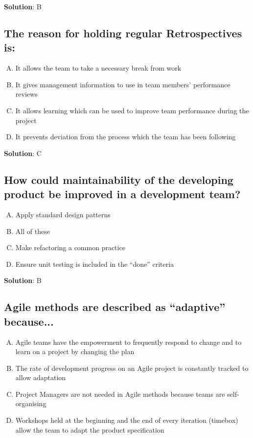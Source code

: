\textbf{Solution}: B


\subsection{The reason for holding regular Retrospectives is:}
\begin{enumerate}[A)]
  \item It allows the team to take a necessary break from work
  \item It gives management information to use in team members’ performance reviews
  \item It allows learning which can be used to improve team performance during the project
  \item It prevents deviation from the process which the team has been following
\end{enumerate}

\textbf{Solution}: C


\subsection{How could maintainability of the developing product be improved in a development team?}
\begin{enumerate}[A)]
  \item Apply standard design patterns
  \item All of these
  \item Make refactoring a common practice
  \item Ensure unit testing is included in the \enquote{done} criteria
\end{enumerate}

\textbf{Solution}: B


\subsection{Agile methods are described as \enquote{adaptive} because...}
\begin{enumerate}[A)]
  \item Agile teams have the empowerment to frequently respond to change and to learn on a project by changing the plan
  \item The rate of development progress on an Agile project is constantly tracked to allow adaptation
  \item Project Managers are not needed in Agile methods because teams are self-organising
  \item Workshops held at the beginning and the end of every iteration (timebox) allow the team to adapt the product specification
\end{enumerate}

